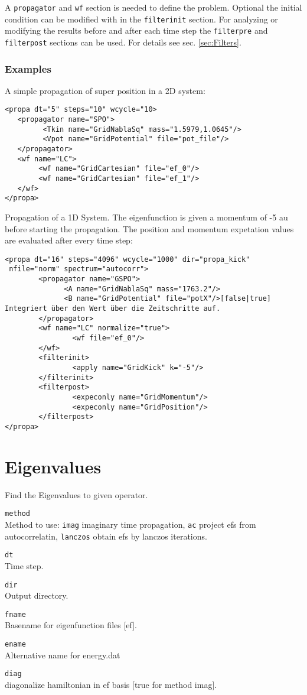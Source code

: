 \documentclass[a4paper,12pt]{scrbook}
\newcommand{\option}[2]{\item \texttt{#1}\\ #2}
\newcommand{\code}[1]{\texttt{#1}}
\begin{document}
A \verb|propagator| and \verb|wf| section is needed to define the problem. Optional the initial condition can
be modified with in the \verb|filterinit| section. For analyzing or modifying the results before and after each time step
the \verb|filterpre| and \verb|filterpost| sections can be used. For details see sec. \ref{sec:Filters}.

\subsubsection*{Examples}
A simple propagation of super position in a 2D system:
\begin{verbatim}
<propa dt="5" steps="10" wcycle="10>
   <propagator name="SPO">
         <Tkin name="GridNablaSq" mass="1.5979,1.0645"/>
         <Vpot name="GridPotential" file="pot_file"/>
   </propagator>
   <wf name="LC">
        <wf name="GridCartesian" file="ef_0"/>
        <wf name="GridCartesian" file="ef_1"/>
   </wf>
</propa> 
\end{verbatim}

Propagation of a 1D System. The eigenfunction is given a momentum of -5 au before starting the
propagation. The position and momentum expetation values are evaluated after every time step:
\begin{verbatim}
<propa dt="16" steps="4096" wcycle="1000" dir="propa_kick"
 nfile="norm" spectrum="autocorr">
        <propagator name="GSPO">
              <A name="GridNablaSq" mass="1763.2"/>
              <B name="GridPotential" file="potX"/>[false|true] Integriert über den Wert über die Zeitschritte auf.
        </propagator>
        <wf name="LC" normalize="true">
                <wf file="ef_0"/>
        </wf>
        <filterinit>
                <apply name="GridKick" k="-5"/>
        </filterinit>
        <filterpost>
                <expeconly name="GridMomentum"/>
                <expeconly name="GridPosition"/>
        </filterpost>
</propa> 
\end{verbatim}


\section{Eigenvalues}
Find the Eigenvalues to given operator.

\begin{options}
\option{method}{Method to use: \code{imag} imaginary time propagation, \code{ac} project efs from autocorrelatin, \code{lanczos} obtain efs by lanczos iterations.}
\option{dt}{Time step.}
\option{dir}{Output directory.}
\option{fname}{Basename for eigenfunction files [ef].}
\option{ename}{Alternative name for energy.dat}
\option{diag}{diagonalize hamiltonian in ef basis [true for method imag].}
\end{options}
\end{document}
